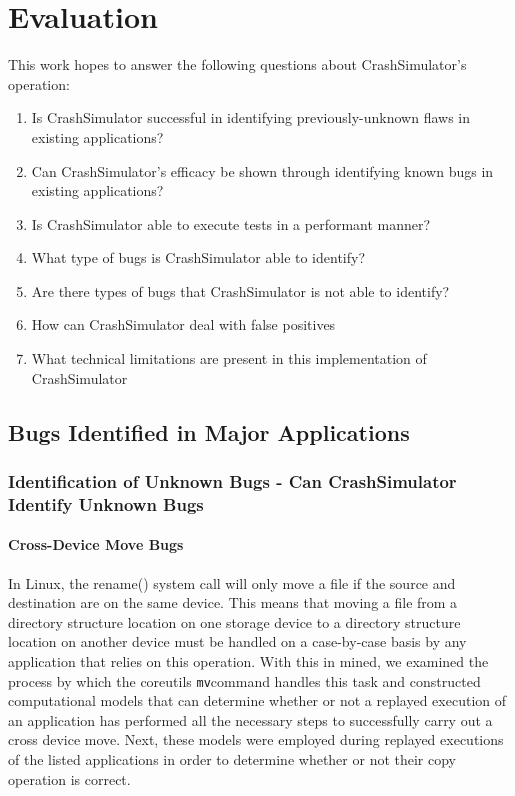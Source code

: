 \section{Evaluation}

    This work hopes to answer the following questions about CrashSimulator's operation:

        \begin{enumerate}
            \item{Is CrashSimulator successful in identifying previously-unknown flaws in existing applications?}
            \item{Can CrashSimulator's efficacy be shown through identifying known bugs in existing applications?}
            \item{Is CrashSimulator able to execute tests in a performant manner?}
            \item{What type of bugs is CrashSimulator able to identify?}
            \item{Are there types of bugs that CrashSimulator is not able to identify?}
            \item{How can CrashSimulator deal with false positives}
            \item{What technical limitations are present in this implementation of CrashSimulator}
        \end{enumerate}

    \subsection{Bugs Identified in Major Applications}

        \subsubsection{Identification of Unknown Bugs - Can CrashSimulator Identify Unknown Bugs}

        \paragraph{Cross-Device Move Bugs}

        In Linux, the rename() system call will only move a file if the source and destination are on the same device.
        This means that moving a file from a directory structure location on one storage device to a directory structure location on
        another device must be handled on a case-by-case basis by any application that relies on this operation.  With
        this in mined, we examined the process by which the coreutils {\tt mv}command handles this task and constructed
        computational models that can determine whether or not a replayed execution of an application has performed all
        the necessary steps to successfully carry out a cross device move.  Next, these models were employed during
        replayed executions of the listed applications in order to determine whether or not their copy operation is correct.

